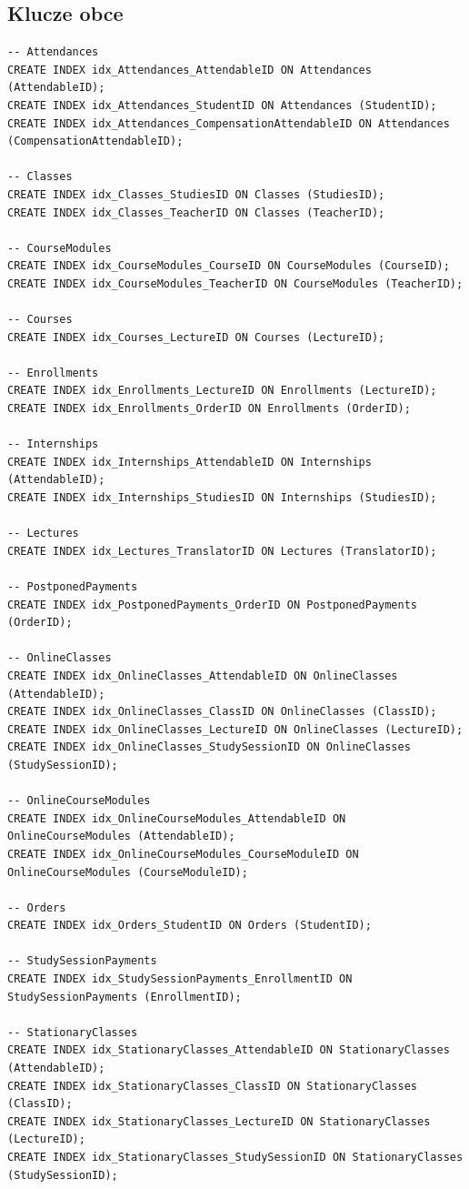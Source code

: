 \documentclass[11pt,a4paper]{article}
\begin{document}
\subsection{Klucze obce}
\begin{Verbatim}[breaklines=true]
-- Attendances
CREATE INDEX idx_Attendances_AttendableID ON Attendances (AttendableID);
CREATE INDEX idx_Attendances_StudentID ON Attendances (StudentID);
CREATE INDEX idx_Attendances_CompensationAttendableID ON Attendances (CompensationAttendableID);

-- Classes
CREATE INDEX idx_Classes_StudiesID ON Classes (StudiesID);
CREATE INDEX idx_Classes_TeacherID ON Classes (TeacherID);

-- CourseModules
CREATE INDEX idx_CourseModules_CourseID ON CourseModules (CourseID);
CREATE INDEX idx_CourseModules_TeacherID ON CourseModules (TeacherID);

-- Courses
CREATE INDEX idx_Courses_LectureID ON Courses (LectureID);

-- Enrollments
CREATE INDEX idx_Enrollments_LectureID ON Enrollments (LectureID);
CREATE INDEX idx_Enrollments_OrderID ON Enrollments (OrderID);

-- Internships
CREATE INDEX idx_Internships_AttendableID ON Internships (AttendableID);
CREATE INDEX idx_Internships_StudiesID ON Internships (StudiesID);

-- Lectures
CREATE INDEX idx_Lectures_TranslatorID ON Lectures (TranslatorID);

-- PostponedPayments
CREATE INDEX idx_PostponedPayments_OrderID ON PostponedPayments (OrderID);

-- OnlineClasses
CREATE INDEX idx_OnlineClasses_AttendableID ON OnlineClasses (AttendableID);
CREATE INDEX idx_OnlineClasses_ClassID ON OnlineClasses (ClassID);
CREATE INDEX idx_OnlineClasses_LectureID ON OnlineClasses (LectureID);
CREATE INDEX idx_OnlineClasses_StudySessionID ON OnlineClasses (StudySessionID);

-- OnlineCourseModules
CREATE INDEX idx_OnlineCourseModules_AttendableID ON OnlineCourseModules (AttendableID);
CREATE INDEX idx_OnlineCourseModules_CourseModuleID ON OnlineCourseModules (CourseModuleID);

-- Orders
CREATE INDEX idx_Orders_StudentID ON Orders (StudentID);

-- StudySessionPayments
CREATE INDEX idx_StudySessionPayments_EnrollmentID ON StudySessionPayments (EnrollmentID);

-- StationaryClasses
CREATE INDEX idx_StationaryClasses_AttendableID ON StationaryClasses (AttendableID);
CREATE INDEX idx_StationaryClasses_ClassID ON StationaryClasses (ClassID);
CREATE INDEX idx_StationaryClasses_LectureID ON StationaryClasses (LectureID);
CREATE INDEX idx_StationaryClasses_StudySessionID ON StationaryClasses (StudySessionID);


\end{Verbatim}
\end{document}

